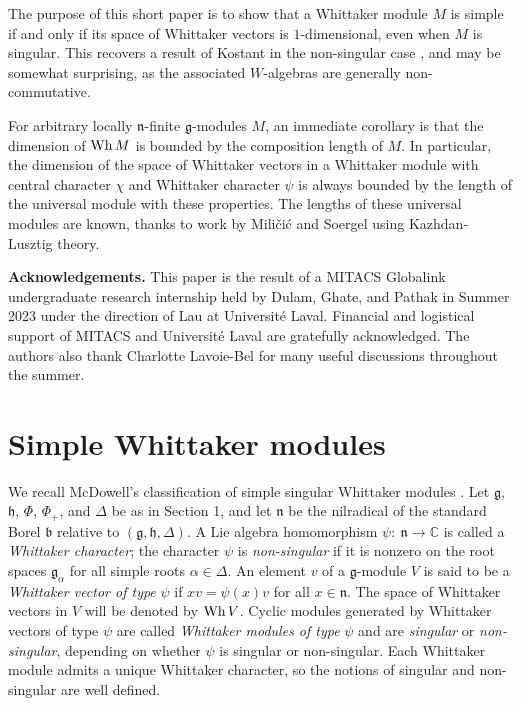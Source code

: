 \documentclass[11pt]{article}
\numberwithin{equation}{section}
\newcommand{\fg}{\mathfrak{g}}
\newcommand{\fh}{{\mathfrak h}}
\newcommand{\ga}{\alpha}
\begin{document}
The purpose of this short paper is to show that a Whittaker module $M$ is simple if and only if its space of Whittaker vectors is $1$-dimensional, even when $M$ is singular.  This recovers a result of Kostant in the non-singular case \cite[Theorem 3.6.1]{kostant78}, and may be somewhat surprising, as the associated $W$-algebras are generally non-commutative.



For arbitrary locally $\mathfrak{n}$-finite $\fg$-modules $M$, an immediate corollary is that the dimension of $\hbox{Wh}\,M$ is bounded by the composition length of $M$.  In particular, the dimension of the space of Whittaker vectors in a Whittaker module with central character $\chi$ and Whittaker character $\psi$ is always bounded by the length of the universal module with these properties.  The lengths of these universal modules are known, thanks to work by Mili\v{c}i\'c and Soergel \cite{milicic-soergel97} using Kazhdan-Lusztig theory. 



\bigskip

\noindent
{\bf Acknowledgements.} This paper is the result of a MITACS Globalink undergraduate research internship held by Dulam, Ghate, and Pathak in Summer 2023 under the direction of Lau at Universit\'e Laval.  Financial and logistical support of MITACS and Universit\'e Laval are gratefully acknowledged.  The authors also thank Charlotte Lavoie-Bel for many useful discussions throughout the summer.



\section{Simple Whittaker modules}

We recall McDowell's classification of simple singular Whittaker modules \cite{mcdowell85}.  Let $\fg$, $\fh$, $\Phi$, $\Phi_+$, and $\Delta$ be as in Section 1, and let $\mathfrak{n}$ be the nilradical of the standard Borel $\mathfrak{b}$ relative to $(\fg,\fh,\Delta)$.  A Lie algebra homomorphism $\psi:\ \mathfrak{n}\rightarrow \mathbb{C}$ is called a {\em Whittaker character}; the character $\psi$ is {\em non-singular} if it is nonzero on the root spaces $\fg_\ga$ for all simple roots $\ga\in\Delta$.  An element $v$ of a $\fg$-module $V$ is said to be a {\em Whittaker vector of type} $\psi$ if $xv=\psi(x)v$ for all $x\in\mathfrak{n}$.  The space of Whittaker vectors in $V$ will be denoted by $\hbox{Wh}\,V$.  Cyclic modules generated by Whittaker vectors of type $\psi$ are called {\em Whittaker modules of type} $\psi$ and are {\em singular} or {\em non-singular}, depending on whether $\psi$ is singular or non-singular.  Each Whittaker module admits a unique Whittaker character, so the notions of singular and non-singular are well defined.
\end{document}
